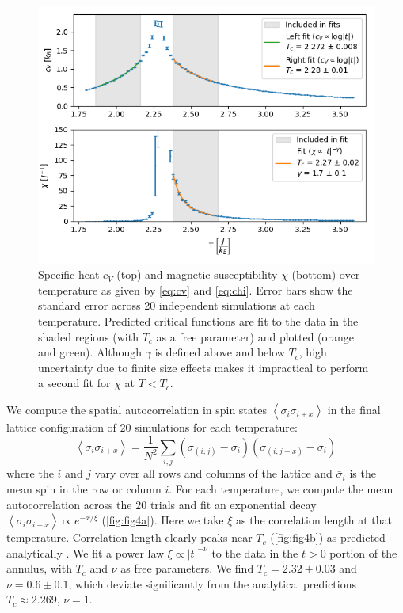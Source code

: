 \documentclass[letter,scriptaddress,twocolumn, prl,nofootinbib]{revtex4}
\newcommand{\submin}[1]{\left\langle #1 \right\rangle}
\begin{document}
\begin{figure}[h]
	\begin{center}
		\includegraphics[width=.5\textwidth]{figs/fig3.png}
		\caption{Specific heat $c_V$ (top) and magnetic susceptibility $\chi$ (bottom) over temperature as given by \autoref{eq:cv} and \autoref{eq:chi}. Error bars show the standard error across 20 independent simulations at each temperature. Predicted critical functions are fit to the data in the shaded regions (with $T_c$ as a free parameter) and plotted (orange and green). Although $\gamma$ is defined above and below $T_c$, high uncertainty due to finite size effects makes it impractical to perform a second fit for $\chi$ at $T < T_c$.}
		\label{fig:fig3}
	\end{center}
\end{figure}

We compute the spatial autocorrelation in spin states $\submin{\sigma_i\sigma_{i + x}}$ in the final lattice configuration of $20$ simulations for each temperature:
\begin{equation}
	\label{autocor}
	\submin{\sigma_i\sigma_{i + x}} = \frac{1}{N^2}\sum_{i, j} (\sigma_{(i, j)} - \bar{\sigma}_i)(\sigma_{(i, j + x)} - \bar{\sigma}_i)
\end{equation}
where the $i$ and $j$ vary over all rows and columns of the lattice and $\bar{\sigma}_i$ is the mean spin in the row or column $i$. For each temperature, we compute the mean autocorrelation across the $20$ trials and fit an exponential decay $\submin{\sigma_i\sigma_{i + x}} \propto e^{-x/\xi}$ (\autoref{fig:fig4a}). Here we take $\xi$ as the correlation length at that temperature. Correlation length clearly peaks near $T_c$ (\autoref{fig:fig4b}) as predicted analytically \cite{Onsager}. We fit a power law $\xi \propto |t|^{-\nu}$ to the data in the $t > 0$ portion of the annulus, with $T_c$ and $\nu$ as free parameters. We find $T_c = 2.32 \pm 0.03$ and $\nu = 0.6 \pm 0.1$, which deviate significantly from the analytical predictions $T_c \approx 2.269$, $\nu = 1$.
\end{document}
